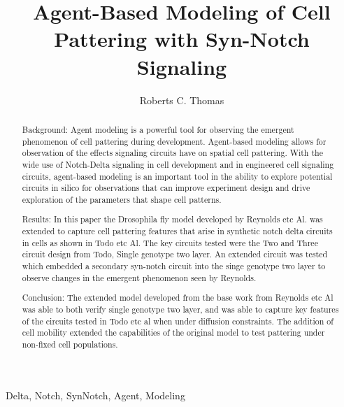 \documentclass[12pt]{ifacconf}
\begin{document}
\begin{frontmatter}


\title{Agent-Based Modeling of Cell Pattering with Syn-Notch Signaling} 



\author[First]{Roberts C. Thomas} 


\address[First]{Cornell University, 
   Ithaca, NY 14850 USA (e-mail: tcr55@cornell.edu).}


\begin{abstract}      %
\begin{bfseries}
 
 
{\large Background:}  Agent modeling is a powerful tool for observing the emergent phenomenon of cell pattering during development. Agent-based modeling allows for observation of the effects signaling circuits have on spatial cell pattering. With the wide use of Notch-Delta signaling in cell development and in engineered cell signaling circuits, agent-based modeling is an important tool in the ability to explore potential circuits in silico for observations that can improve experiment design and drive exploration of the parameters that shape cell patterns.
 
{\large Results:}  In this paper the Drosophila fly model developed by Reynolds etc Al. was extended to capture cell pattering features that arise in synthetic notch delta circuits in cells as shown in Todo etc Al. The key circuits tested were the Two and Three circuit design from Todo, Single genotype two layer. An extended circuit was tested which embedded a secondary syn-notch circuit into the singe genotype two layer to observe changes in the emergent phenomenon seen by Reynolds.
 
{\large Conclusion:} The extended model developed from the base work from Reynolds etc Al was able to both verify single genotype two layer, and was able to capture key features of the circuits tested in Todo etc al when under diffusion constraints. The addition of cell mobility extended the capabilities of the original model to test pattering under non-fixed cell populations.
\end{bfseries}
\end{abstract}

\begin{keyword}
Delta, Notch, SynNotch, Agent, Modeling
\end{keyword}

\end{frontmatter}
\end{document}
